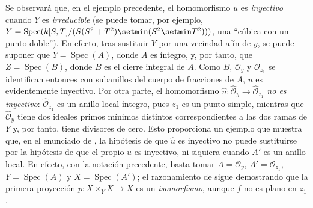 \begin{env}[11.7.4]
\label{IV.11.7.4}
Se observará que, en el ejemplo precedente, el homomorfismo $u$ es \emph{inyectivo} cuando $Y$ es \emph{irreducible} (se puede tomar, por ejemplo, $Y=\operatorname{Spec}(k[S,T]/(S(S^2+T^2)\setmin(S^2\setmin T^2)))$, una ``cúbica con un punto doble''). En efecto, tras sustituir $Y$ por una vecindad afín de $y$, se puede suponer que $Y=\operatorname{Spec}(A)$, donde $A$ es íntegro, y, por tanto, que $Z=\operatorname{Spec}(B)$, donde $B$ es el cierre integral de $A$. Como $B$, $\mathcal O_y$ y $\mathcal O_{z_1}$ se identifican entonces con subanillos del
cuerpo de fracciones de $A$, $u$ es evidentemente inyectivo.
Por otra parte, el homomorfismo $\widehat u:\widehat{\mathcal O}_y\to
\widehat{\mathcal O}_{z_1}$ \emph{no es inyectivo}: $\widehat{\mathcal O}_{z_1}$ es un anillo local íntegro, pues $z_1$ es un punto simple, mientras que $\widehat{\mathcal O}_y$ tiene dos ideales primos mínimos distintos correspondientes a las dos ramas de $Y$ y, por tanto, tiene divisores de cero.
Esto proporciona un ejemplo que muestra que, en el enunciado de , la hipótesis de que $\widehat u$ es inyectivo no puede sustituirse por la hipótesis de que el propio $u$ es inyectivo, ni siquiera cuando $A'$ es un anillo local.
En efecto, con la notación precedente, basta tomar $A=\mathcal O_y$, $A'=\mathcal O_{z_1}$, $Y=\operatorname{Spec}(A)$ y $X=\operatorname{Spec}(A')$; el razonamiento de  sigue demostrando que la primera proyección $p:X\times_Y X\to X$ es un \emph{isomorfismo}, aunque $f$ no es plano en $z_1$.
\end{env}

